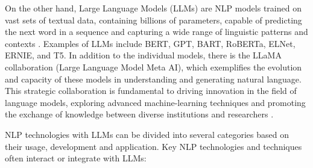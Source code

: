 On the other hand, Large Language Models (LLMs) are NLP models trained on vast sets of textual data, containing billions of parameters, capable of predicting the next word in a sequence and capturing a wide range of linguistic patterns and contexts \cite{hou2023}. Examples of LLMs include BERT, GPT, BART, RoBERTa, ELNet, ERNIE, and T5. In addition to the individual models, there is the LLaMA collaboration (Large Language Model Meta AI), which exemplifies the evolution and capacity of these models in understanding and generating natural language. This strategic collaboration is fundamental to driving innovation in the field of language models, exploring advanced machine-learning techniques and promoting the exchange of knowledge between diverse institutions and researchers \cite{tsai2023llamaloop}.

NLP technologies with LLMs can be divided into several categories based on their usage, development and application. Key NLP technologies and techniques often interact or integrate with LLMs:

